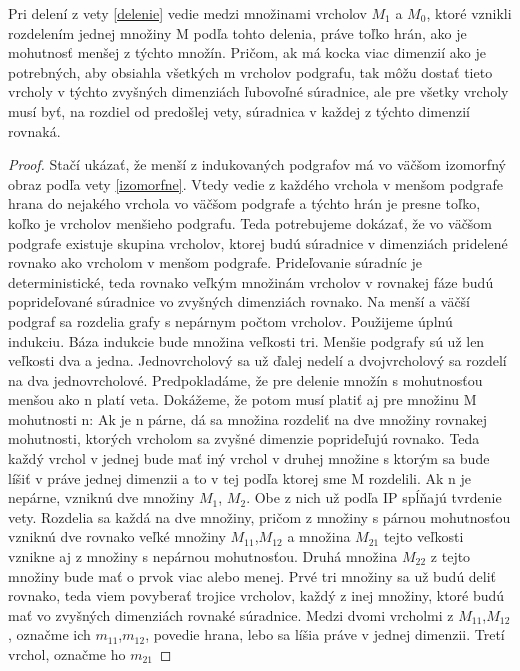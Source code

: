 \begin{lem}
Pri delení z vety \ref{delenie} vedie medzi množinami vrcholov $M_{1}$ a $M_{0}$,
ktoré vznikli rozdelením jednej množiny M podľa tohto delenia, práve toľko
hrán, ako je mohutnosť menšej z týchto množín. Pričom, ak má kocka viac dimenzií ako
je potrebných, aby obsiahla všetkých m vrcholov podgrafu, tak môžu dostať
tieto vrcholy v týchto zvyšných dimenziách ľubovoľné súradnice, ale pre
všetky vrcholy musí byť, na rozdiel od predošlej vety, súradnica
 v každej z týchto dimenzií rovnaká.
\end{lem}

\begin{proof}
Stačí ukázať, že menší z indukovaných podgrafov má vo väčšom izomorfný obraz
podľa vety \ref{izomorfne}. Vtedy vedie z každého vrchola v menšom podgrafe
hrana do nejakého vrchola vo väčšom podgrafe a týchto hrán je presne toľko, koľko je
vrcholov menšieho podgrafu.
Teda potrebujeme dokázať, že vo väčšom podgrafe existuje skupina vrcholov,
ktorej budú súradnice v dimenziách pridelené rovnako ako vrcholom v menšom
podgrafe. Prideľovanie súradníc je deterministické, teda rovnako veľkým
množinám vrcholov v rovnakej fáze budú poprideľované súradnice vo zvyšných
dimenziách rovnako. Na menší a väčší podgraf sa rozdelia grafy s nepárnym
počtom vrcholov.
Použijeme úplnú indukciu. Báza indukcie bude množina veľkosti tri. Menšie
podgrafy sú už len veľkosti dva a jedna. Jednovrcholový sa už ďalej nedelí a
dvojvrcholový sa rozdelí na dva jednovrcholové.
Predpokladáme, že pre delenie množín s mohutnosťou menšou ako n platí veta.
Dokážeme, že potom musí platiť aj pre množinu M mohutnosti n: Ak je n párne,
dá sa množina rozdeliť na dve množiny rovnakej mohutnosti, ktorých vrcholom
sa zvyšné dimenzie poprideľujú rovnako. Teda každý vrchol v jednej bude mať
iný vrchol v druhej množine s ktorým sa bude líšiť v práve jednej dimenzii
a to v tej podľa ktorej sme M rozdelili.
Ak n je nepárne, vzniknú dve množiny $M_{1}$, $M_{2}$. Obe z nich už
podľa IP spĺňajú tvrdenie vety. Rozdelia sa každá na dve množiny, pričom z
množiny s párnou mohutnosťou vzniknú dve rovnako veľké množiny
$M_{11}$,$M_{12}$ a množina $M_{21}$
tejto veľkosti vznikne aj z množiny s nepárnou mohutnosťou. Druhá množina
$M_{22}$ z tejto množiny bude mať o prvok viac alebo menej.
Prvé tri množiny sa už budú deliť rovnako, teda viem povyberať trojice
vrcholov, každý z inej množiny, ktoré budú mať vo zvyšných dimenziách
rovnaké súradnice. Medzi dvomi vrcholmi z $M_{11}$,$M_{12}$, označme ich 
$m_{11}$,$m_{12}$,  povedie hrana,
lebo sa líšia práve v jednej dimenzii. Tretí vrchol, označme ho $m_{21}$

\end{proof}
